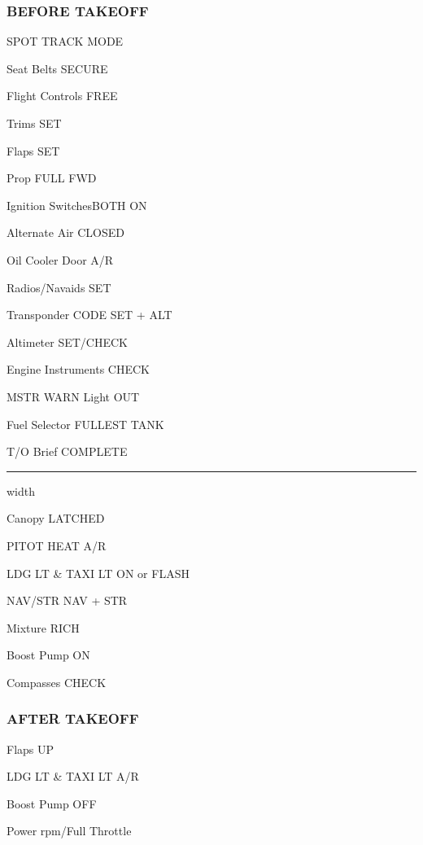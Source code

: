 \begin{multicols}{2}
\subsubsection*{BEFORE TAKEOFF}
\begin{enumerate*}
\item SPOT \dotfill TRACK MODE
\item Seat Belts \dotfill SECURE
\item Flight Controls \dotfill FREE
\item Trims \dotfill SET
\item Flaps \dotfill SET
\item Prop \dotfill FULL FWD
\item Ignition Switches\dotfill BOTH ON
\item Alternate Air \dotfill CLOSED
\item Oil Cooler Door \dotfill A/R
\item Radios/Navaids \dotfill SET
\item Transponder \dotfill CODE SET + ALT
\item Altimeter \dotfill SET/CHECK
\item Engine Instruments \dotfill CHECK
\item MSTR WARN Light \dotfill OUT
\item Fuel Selector \dotfill FULLEST TANK
\item T/O Brief \dotfill COMPLETE\vspace{0.5ex}
\hrule width \columnwidth \vspace{1ex}
\item Canopy \dotfill LATCHED
\item PITOT HEAT \dotfill A/R
\item LDG LT \& TAXI LT \dotfill ON or FLASH
\item NAV/STR \dotfill NAV + STR
\item Mixture \dotfill RICH
\item Boost Pump \dotfill ON
\item Compasses \dotfill CHECK
\end{enumerate*}

\subsubsection*{AFTER TAKEOFF}
\begin{enumerate*}
\item Flaps \dotfill UP
\item LDG LT \& TAXI LT \dotfill A/R
\item Boost Pump \dotfill OFF
\item Power  rpm/Full Throttle
\end{enumerate*}


\end{multicols}
